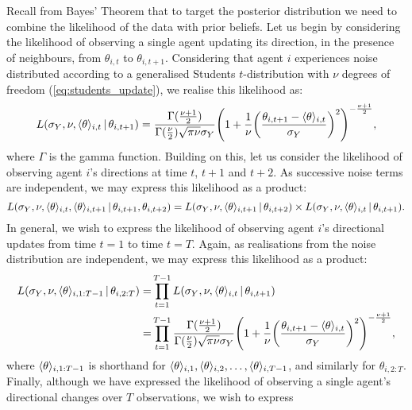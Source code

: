 Recall from Bayes' Theorem that to target the posterior distribution we need to combine
the likelihood of the data with prior beliefs. Let us begin by considering the likelihood
of observing a single agent updating its direction, in the presence of neighbours, from
$\theta_{i, t}$ to $\theta_{i, t+1}$. Considering that agent $i$ experiences noise
distributed according to a generalised Students $t$-distribution with $\nu$ degrees of
freedom (\cref{eq:students_update}), we realise this likelihood as:
\begin{equation*}
    L(\sigma_Y, \nu, \langle\theta\rangle_{i,t} \,|\, \theta_{i,t+1}) = 
    \frac{\Gamma(\frac{\nu +1 }{2})}{\Gamma(\frac{\nu}{2})\sqrt{\pi\nu}\sigma_Y}
        \Bigg(1 + \frac{1}{\nu}
                  \bigg(\frac{\theta_{i,t+1}-\langle\theta\rangle_{i,t}}{\sigma_Y}\bigg)^2
        \Bigg)^{-\frac{\nu+1}{2}},
\end{equation*}
where $\Gamma$ is the gamma function. Building on this, let us consider the likelihood of
observing agent $i$'s directions at time $t$, $t+1$ and $t+2$. As successive noise terms
are independent, we may express this likelihood as a product:
\begin{equation*}
    L(\sigma_Y,\nu,\langle\theta\rangle_{i,t},\langle\theta\rangle_{i,t+1}\,|\,\theta_{i,t+1},
    \theta_{i,t+2}) =
    L(\sigma_Y,\nu,\langle\theta\rangle_{i,t+1}\,|\,\theta_{i,t+2})\times
    L(\sigma_Y,\nu,\langle\theta\rangle_{i,t}\,|\,\theta_{i,t+1}).
\end{equation*}
In general, we wish to express the likelihood of observing agent $i$'s directional updates
from time $t=1$ to time $t=T$. Again, as realisations from the noise distribution are
independent, we may express this likelihood as a product:
\begin{align*}
    L(\sigma_Y, \nu, \langle\theta\rangle_{i,1:T-1} \,|\, \theta_{i,2:T})
    =& \prod_{t=1}^{T-1} L(\sigma_Y,\nu,\langle\theta\rangle_{i,t} \,|\, \theta_{i,t+1}) \\
    =& \prod_{t=1}^{T-1} 
        \frac{\Gamma(\frac{\nu +1 }{2})}{\Gamma(\frac{\nu}{2})\sqrt{\pi\nu}\sigma_Y}
        \Bigg(1 + \frac{1}{\nu}
                  \bigg(\frac{\theta_{i,t+1}-\langle\theta\rangle_{i,t}}{\sigma_Y}\bigg)^2
        \Bigg)^{-\frac{\nu+1}{2}},
\end{align*}
where $\langle\theta\rangle_{i,1:T-1}$ is shorthand for
$\langle\theta\rangle_{i,1},\langle\theta\rangle_{i,2},\ldots,\langle\theta\rangle_{i,T-1}$, and
similarly for $\theta_{i,2:T}$. Finally, although we have expressed the likelihood of
observing a single agent's directional changes over $T$ observations, we wish to express

